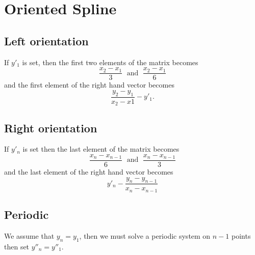 \documentclass[aps]{revtex4}
\begin{document}
\section{Oriented Spline}
\subsection{Left orientation}
If $y'_1$ is set, then the first two elements of the matrix becomes
$$
	\dfrac{x_2-x_1}{3} \;\text{ and }\; \dfrac{x_2-x_1}{6}
$$
and the first element of the right hand vector becomes
$$
	\dfrac{y_2-y_1}{x_2-x1} - y'_1.
$$
\subsection{Right orientation}
If $y'_n$ is set then the last element of the matrix becomes
$$
	\dfrac{x_n-x_{n-1}}{6}\;\text{ and }\;\dfrac{x_n-x_{n-1}}{3}
$$
and the last element of the right hand vector becomes
$$
	y'_n - \dfrac{y_n-y_{n-1}}{x_n-x_{n-1}}
$$
\subsection{Periodic}
We assume that $y_n=y_1$, then
we must solve a periodic system on $n-1$ points then set $y''_n=y''_1$.
\end{document}
